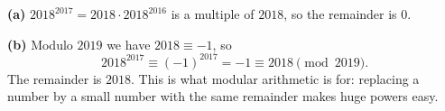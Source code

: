 \textbf{(a)} $2018^{2017}=2018\cdot2018^{2016}$ is a multiple of $2018$, so the remainder is $\boxed{0}$.

\textbf{(b)} Modulo $2019$ we have $2018\equiv-1$, so
\[
2018^{2017}\equiv(-1)^{2017}=-1\equiv2018\pmod{2019}.
\]
The remainder is $\boxed{2018}$. This is what modular arithmetic is for: replacing a number by a small number with the same remainder makes huge powers easy.
